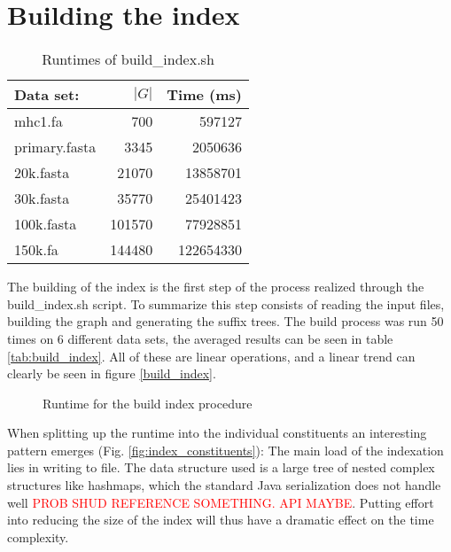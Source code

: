 \documentclass[thesis.tex]{subfiles}
\begin{document}
\section{Building the index}
\begin{wraptable}{r}{0.5\textwidth}
  \begin{tabular}{|l|r|r|}
    \hline \textbf{Data set:} & \textbf{$|G|$} & \textbf{Time (ms)}\\ \hline
    mhc1.fa & 700 & 597127\\ \hline
    primary.fasta & 3345 & 2050636\\ \hline
    20k.fasta & 21070 & 13858701\\ \hline
    30k.fasta & 35770 & 25401423\\ \hline
    100k.fasta & 101570 & 77928851\\ \hline
    150k.fa & 144480 & 122654330\\ \hline
  \end{tabular}
  \caption{Runtimes of build\_index.sh}
\end{wraptable}
The building of the index is the first step of the process realized through the build\_index.sh script. To summarize this step consists of reading the input files, building the graph and generating the suffix trees. The build process was run 50 times on 6 different data sets, the averaged results can be seen in table \ref{tab:build_index}. All of these are linear operations, and a linear trend can clearly be seen in figure \ref{build_index}.\\
\begin{figure}[!b]
    \caption{Runtime for the build index procedure}
    \label{fig:build_index}
\end{figure}
\clearpage
\noindent
When splitting up the runtime into the individual constituents an interesting pattern emerges (Fig. \ref{fig:index_constituents}): The main load of the indexation lies in writing to file. The data structure used is a large tree of nested complex structures like hashmaps, which the standard Java serialization does not handle well \textcolor{red}{PROB SHUD REFERENCE SOMETHING. API MAYBE}. Putting effort into reducing the size of the index will thus have a dramatic effect on the time complexity.
\end{document}

